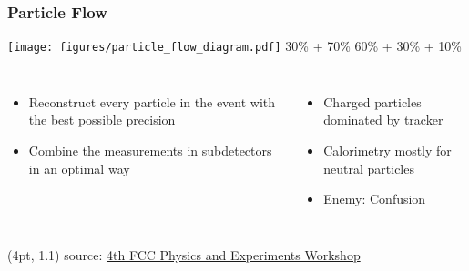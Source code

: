 \documentclass[aspectratio=169]{beamer}
\newcommand{\bluetext}[1]{%
  \textcolor{myBlue}{#1}
}
\begin{document}
\begin{frame}
  \frametitle{Particle Flow}

  \texttt{[image: figures/particle\_flow\_diagram.pdf]}
  \vspace{-1.5ex}
  \hspace{6.7em} 30\% + 70\% \hspace{14.5em} 60\% + 30\% + 10\%

  \begin{columns}[c]
    \begin{itemize}
      \item Reconstruct every particle in the event with the best possible
            precision
      \item Combine the measurements in subdetectors in an optimal way
    \end{itemize}

    \begin{itemize}
      \item Charged particles dominated by tracker
      \item Calorimetry mostly for neutral particles
      \item \bluetext{Enemy: Confusion}
    \end{itemize}
  \end{columns}

  \begin{textblock*}{\paperwidth}(4pt, 1.1\textheight)
    \tiny source:
    \href{https://indico.cern.ch/event/932973/}
         {4th FCC Physics and Experiments Workshop}
  \end{textblock*}
\end{frame}
\end{document}
